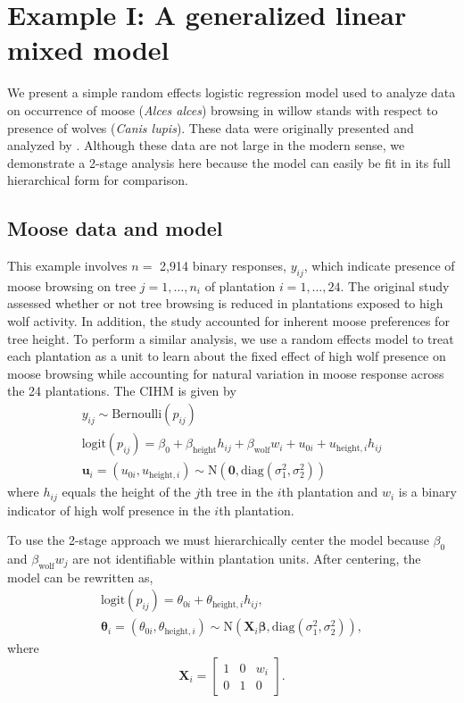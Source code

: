\documentclass[12pt]{article}
\newcommand{\bt}{\boldsymbol{\theta}}
\newcommand{\bb}{\boldsymbol{\beta}}
\begin{document}
\section{Example I: A generalized linear mixed model} \label{sec:moose.wolf}

We present a simple random effects logistic regression model used to analyze data on occurrence of moose ({\it Alces alces}) browsing in willow stands with respect to presence of wolves ({\it Canis lupis}). These data were originally presented and analyzed by \cite{van2018does}. Although these data are not large in the modern sense, we demonstrate a 2-stage analysis here because the model can easily be fit in its full hierarchical form for comparison. 

\subsection{Moose data and model}

This example involves $n =$ 2,914 binary responses, $y_{ij}$, which indicate presence of moose browsing on tree $j=1,\dots,n_i$ of plantation $i=1,\dots,24$. The original study assessed whether or not tree browsing is reduced in plantations exposed to high wolf activity. In addition, the study accounted for inherent moose preferences for tree height. To perform a similar analysis, we use a random effects model to treat each plantation as a unit to learn about the fixed effect of high wolf presence on moose browsing while accounting for natural variation in moose response across the 24 plantations. The CIHM is given by
\[
\begin{gathered}
y_{ij} \sim \text{Bernoulli}(p_{ij}) \\
\text{logit}(p_{ij}) = \beta_0 + \beta_{\text{height}}h_{ij} + \beta_{\text{wolf}}w_i + u_{0i} + u_{\text{height},i} h_{ij}\\
\mathbf{u}_i = (u_{0i}, u_{\text{height},i}) \sim \text{N}(\mathbf{0},\text{diag}(\sigma_1^2, \sigma_2^2))
\end{gathered}
\]
where $h_{ij}$ equals the height of the $j$th tree in the $i$th plantation and $w_i$ is a binary indicator of high wolf presence in the $i$th plantation.

To use the 2-stage approach we must hierarchically center the model because $\beta_0$ and $\beta_{\text{wolf}}w_j$ are not identifiable within plantation units. After centering, the model can be rewritten as,
\[
\begin{gathered}
\text{logit}(p_{ij}) = \theta_{0i} + \theta_{\text{height},i}h_{ij},\\
\bt_i = (\theta_{0i}, \theta_{\text{height},i}) \sim \text{N}(\mathbf{X}_i\bb, \text{diag}(\sigma^2_1, \sigma^2_2)) ,
\end{gathered}
\]
where
\[
\mathbf{X}_i = \left[ 
\begin{array}{ccc}
1 & 0 & w_i \\
0 & 1 & 0
\end{array}
\right].
\]
\end{document}

